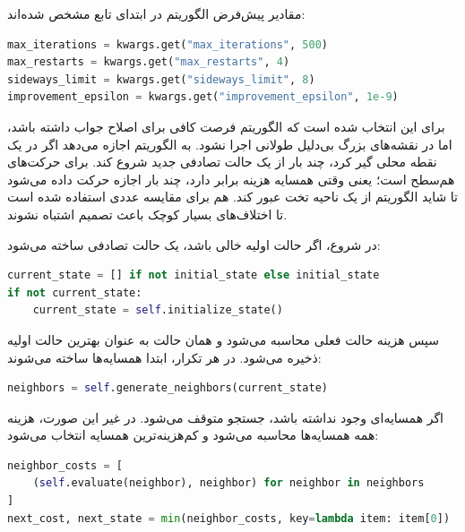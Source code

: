 \documentclass[10.5pt]{exam}
\begin{document}
مقادیر پیش‌فرض الگوریتم در ابتدای تابع
مشخص شده‌اند:

\begin{latin}
\begin{lstlisting}[language=Python]
max_iterations = kwargs.get("max_iterations", 500)
max_restarts = kwargs.get("max_restarts", 4)
sideways_limit = kwargs.get("sideways_limit", 8)
improvement_epsilon = kwargs.get("improvement_epsilon", 1e-9)
\end{lstlisting}
\end{latin}

برای این انتخاب شده است که الگوریتم فرصت کافی برای اصلاح جواب داشته باشد، اما در نقشه‌های بزرگ بی‌دلیل طولانی اجرا نشود.
به الگوریتم اجازه می‌دهد اگر در یک نقطه محلی گیر کرد، چند بار از یک حالت تصادفی جدید شروع کند.
برای حرکت‌های هم‌سطح است؛ یعنی وقتی همسایه هزینه برابر دارد، چند بار اجازه حرکت داده می‌شود تا شاید الگوریتم از یک ناحیه تخت عبور کند.
هم برای مقایسه عددی استفاده شده است تا اختلاف‌های بسیار کوچک باعث تصمیم اشتباه نشوند.

در شروع، اگر حالت اولیه خالی باشد، یک حالت تصادفی ساخته می‌شود:

\begin{latin}
\begin{lstlisting}[language=Python]
current_state = [] if not initial_state else initial_state
if not current_state:
    current_state = self.initialize_state()
\end{lstlisting}
\end{latin}

سپس هزینه حالت فعلی محاسبه می‌شود و همان حالت به عنوان بهترین حالت اولیه ذخیره می‌شود. در هر تکرار، ابتدا همسایه‌ها ساخته می‌شوند:

\begin{latin}
\begin{lstlisting}[language=Python]
neighbors = self.generate_neighbors(current_state)
\end{lstlisting}
\end{latin}

اگر همسایه‌ای وجود نداشته باشد، جستجو متوقف می‌شود. در غیر این صورت، هزینه همه همسایه‌ها محاسبه می‌شود و کم‌هزینه‌ترین همسایه انتخاب می‌شود:

\begin{latin}
\begin{lstlisting}[language=Python]
neighbor_costs = [
    (self.evaluate(neighbor), neighbor) for neighbor in neighbors
]
next_cost, next_state = min(neighbor_costs, key=lambda item: item[0])
\end{lstlisting}
\end{latin}
\end{document}
